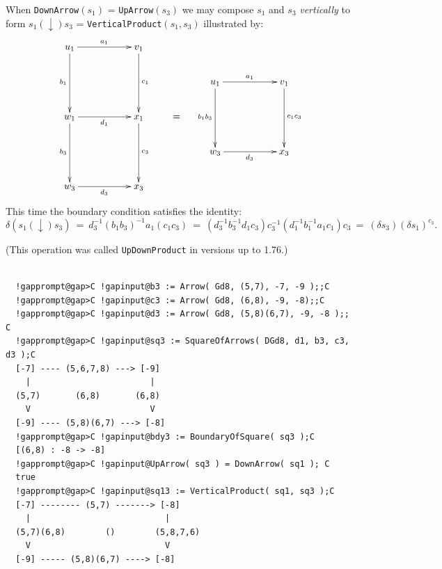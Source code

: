 \documentclass[a4paper,11pt]{report}
\begin{document}
{{{ When \texttt{DownArrow}$(s_1)$ = \texttt{UpArrow}$(s_3)$ we may compose $s_1$ and $s_3$ \emph{vertically} to form $s_1 (\downarrow) s_3$ = \texttt{VerticalProduct}$(s_1,s_3)$ illustrated by: 
\[  \vcenter{\xymatrix @=2pc{ u_1 \ar[rr]^{a_1} \ar[dd]_{b_1} && v_1 \ar[dd]^{c_1}
& & && \\ && & & u_1 \ar[rr]^{a_1} \ar[dd]_{b_1b_3} && v_1 \ar[dd]^{c_1c_3} \\
w_1 \ar[rr]_{d_1} \ar[dd]_{b_3} && x_1 \ar[dd]^{c_3} &=& && \\ && & & w_3
\ar[rr]_{d_3} && x_3 \\ w_3 \ar[rr]_{d_3} && x_3 }} \]
 This time the boundary condition satisfies the identity: 
\[ \delta(s_1 (\downarrow) s_3) ~=~ d_3^{-1}(b_1b_3)^{-1}a_1(c_1c_3) ~=~
(d_3^{-1}b_3^{-1}d_1c_3)c_3^{-1}(d_1^{-1}b_1^{-1}a_1c_1)c_3 ~=~ (\delta
s_3)(\delta s_1)^{c_3}. \]
 

 (This operation was called \texttt{UpDownProduct} in versions up to 1.76.) 

 }

 
\begin{Verbatim}[commandchars=!@C,fontsize=\small,frame=single,label=Example]
  
  !gapprompt@gap>C !gapinput@b3 := Arrow( Gd8, (5,7), -7, -9 );;C
  !gapprompt@gap>C !gapinput@c3 := Arrow( Gd8, (6,8), -9, -8);;C
  !gapprompt@gap>C !gapinput@d3 := Arrow( Gd8, (5,8)(6,7), -9, -8 );; C
  !gapprompt@gap>C !gapinput@sq3 := SquareOfArrows( DGd8, d1, b3, c3, d3 );C
  [-7] ---- (5,6,7,8) ---> [-9]
    |                        |
  (5,7)       (6,8)       (6,8)
    V                        V
  [-9] ---- (5,8)(6,7) ---> [-8]
  !gapprompt@gap>C !gapinput@bdy3 := BoundaryOfSquare( sq3 );C
  [(6,8) : -8 -> -8]
  !gapprompt@gap>C !gapinput@UpArrow( sq3 ) = DownArrow( sq1 ); C
  true
  !gapprompt@gap>C !gapinput@sq13 := VerticalProduct( sq1, sq3 );C
  [-7] -------- (5,7) -------> [-8]
    |                           |
  (5,7)(6,8)        ()        (5,8,7,6)
    V                           V
  [-9] ----- (5,8)(6,7) ----> [-8]
  
  
\end{Verbatim}
 

}}
\end{document}
